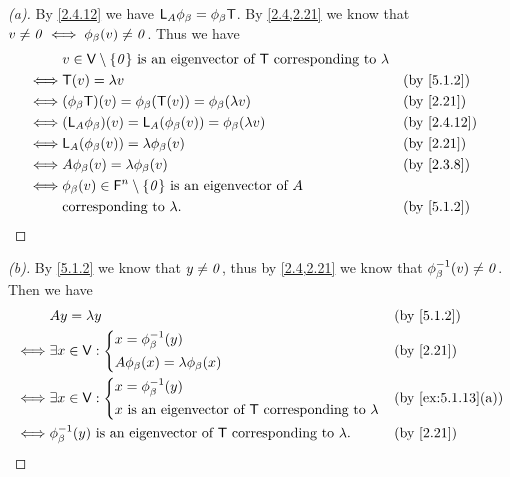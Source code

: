 \begin{proof}[(a)]
  By \cref{2.4.12} we have \(\mathsf{L}_A \phi_{\beta} = \phi_{\beta} \mathsf{T}\).
  By \cref{2.4,2.21} we know that \(v \neq \mathit{0} \iff \phi_{\beta}(v) \neq \mathit{0}\).
  Thus we have
  \begin{align*}
         & v \in \V \setminus \set{\zv} \text{ is an eigenvector of } \T \text{ corresponding to } \lambda                  \\
    \iff & \T(v) = \lambda v                                                                               &  & \by{5.1.2}  \\
    \iff & (\phi_{\beta} \T)(v) = \phi_{\beta}(\T(v)) = \phi_{\beta}(\lambda v)                            &  & \by{2.21}   \\
    \iff & (\L_A \phi_{\beta})(v) = \L_A(\phi_{\beta}(v)) = \phi_{\beta}(\lambda v)                        &  & \by{2.4.12} \\
    \iff & \L_A(\phi_{\beta}(v)) = \lambda \phi_{\beta}(v)                                                 &  & \by{2.21}   \\
    \iff & A \phi_{\beta}(v) = \lambda \phi_{\beta}(v)                                                     &  & \by{2.3.8}  \\
    \iff & \phi_{\beta}(v) \in \vs{F}^n \setminus \set{\zv} \text{ is an eigenvector of } A                                 \\
         & \text{corresponding to } \lambda.                                                               &  & \by{5.1.2}
  \end{align*}
\end{proof}

\begin{proof}[(b)]
  By \cref{5.1.2} we know that \(y \neq \mathit{0}\), thus by \cref{2.4,2.21} we know that \(\phi_{\beta}^{-1}(v) \neq \mathit{0}\).
  Then we have
  \begin{align*}
         & A y = \lambda y                                                                          &  & \by{5.1.2} \\
    \iff & \exists x \in \V : \begin{dcases}
                                x = \phi_{\beta}^{-1}(y) \\
                                A \phi_{\beta}(x) = \lambda \phi_{\beta}(x)
                              \end{dcases}                                              &  & \by{2.21}              \\
    \iff & \exists x \in \V : \begin{dcases}
                                x = \phi_{\beta}^{-1}(y) \\
                                x \text{ is an eigenvector of } \T \text{ corresponding to } \lambda
                              \end{dcases}                     &  & \by{ex:5.1.13}[a]                   \\
    \iff & \phi_{\beta}^{-1}(y) \text{ is an eigenvector of } \T \text{ corresponding to } \lambda. &  & \by{2.21}
  \end{align*}
\end{proof}

